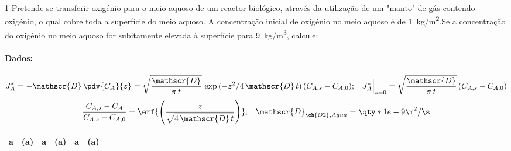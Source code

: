 \documentclass[\mainfilename]{subfiles}
\begin{document}
\begin{questionBox}1{ %
    Pretende-se transferir oxigénio para o meio aquoso de um reactor biológico, através da utilização de um "manto" de gás contendo oxigénio, o qual cobre toda a superfície do meio aquoso. A concentração inicial de oxigénio no meio aquoso é de \qty*{1}{\kg/\m^2}.Se a concentração do oxigénio no meio aquoso for subitamente elevada à superfície para \qty*{9}{\kg/\m^3}, calcule:
} %
    \paragraph*{Dados:}
    \begin{align*}
        J_A^*
        = -\mathscr{D}
        \,\pdv{C_A}{z}
        = \sqrt{\frac{\mathscr{D}}{\pi\,t}}
        \,\exp{(-z^2/4\,\mathscr{D}\,t)}
        \,(C_{A,s}-C_{A,0})
        ;&&
        J_A^*
        \Big\vert_{z=0}
        = \sqrt{\frac{\mathscr{D}}{\pi\,t}}
        \,(C_{A,s}-C_{A,0})
    \end{align*}
    \begin{align*}
        \frac
        {C_{A,s}-C_{A}}
        {C_{A,s}-C_{A,0}}
        &= \erf{\left(
            \frac{z}{\sqrt{4\,\mathscr{D}\,t}}
        \right)}
        ;&
        \mathscr{D}_{\ch{O2},Agua}=\qty*{1e-9}{\m^2/\s}
    \end{align*}
    \begin{center}
        \vspace{1ex}
        \begin{tabular}{LL *{2}{ | LL}}
            \toprule
            
                & 
                & 
                & 
                & 
                & 
            
            \\\midrule
            

\end{tabular}
\end{center}
\end{questionBox}
\end{document}
